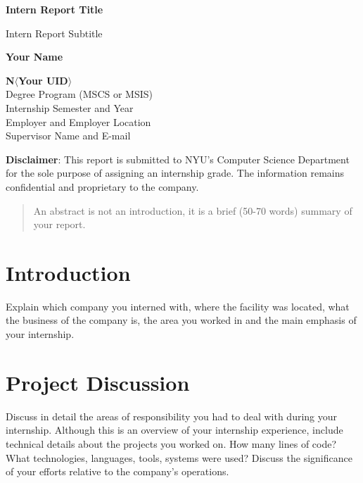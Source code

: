 \documentclass[12pt]{report}
\begin{document}
\begin{titlepage}
    \begin{center}
        \vspace*{1cm}
        \Huge
        \textbf{Intern Report Title}
        
        \Large
        \vspace{0.5cm}
        Intern Report Subtitle
        
        \LARGE
        \vspace{0.4cm}
        \textbf{Your Name}
        
        \vfill
        \Large
        \textbf{N$\langle$Your UID$\rangle$} \\
        Degree Program (MSCS or MSIS) \\
        Internship Semester and Year \\
        Employer and Employer Location \\
        Supervisor Name and E-mail \\
    \end{center}
    \textbf{Disclaimer}: This report is submitted to NYU’s Computer Science Department for the sole purpose of assigning an internship grade. The information remains confidential and proprietary to the company.
\end{titlepage}

\begin{abstract}
An abstract is not an introduction, it is a brief (50-70 words) summary of your report.
\end{abstract}

\section*{Introduction}
Explain which company you interned with, where the facility was located, what the business of the company is, the area you worked in and the main emphasis of your internship.

\section*{Project Discussion}
Discuss in detail the areas of responsibility you had to deal with during your internship. Although this is an overview of your internship experience, include technical details about the projects you worked on. How many lines of code? What technologies, languages, tools, systems were used? Discuss the significance of your efforts relative to the company’s operations.
\end{document}
